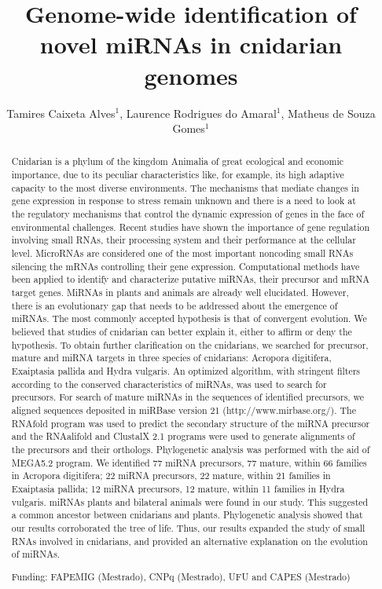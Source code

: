 \documentclass[twoside]{article}
\title{\vspace{-15mm}\fontsize{24pt}{10pt}\selectfont\textbf{Genome-wide identification of novel miRNAs in cnidarian genomes}} %
\author{Tamires Caixeta Alves$^1$, Laurence Rodrigues do Amaral$^1$, Matheus de Souza Gomes$^1$}
\affil{1 UFU\\ }
\date{}
\begin{document}
\maketitle %

\thispagestyle{fancy} %


\begin{abstract}
Cnidarian is a phylum of the kingdom Animalia of great ecological and economic importance, due to its peculiar characteristics like, for example, its high adaptive capacity to the most diverse environments. The mechanisms that mediate changes in gene expression in response to stress remain unknown and there is a need to look at the regulatory mechanisms that control the dynamic expression of genes in the face of environmental challenges. Recent studies have shown the importance of gene regulation involving small RNAs, their processing system and their performance at the cellular level. MicroRNAs are considered one of the most important noncoding small RNAs silencing the mRNAs controlling their gene expression. Computational methods have been applied to identify and characterize putative miRNAs, their precursor and mRNA target genes. MiRNAs in plants and animals are already well elucidated. However, there is an evolutionary gap that needs to be addressed about the emergence of miRNAs. The most commonly accepted hypothesis is that of convergent evolution. We believed that studies of cnidarian can better explain it, either to affirm or deny the hypothesis. To obtain further clarification on the cnidarians, we searched for precursor, mature and miRNA targets in three species of cnidarians: Acropora digitifera, Exaiptasia pallida and Hydra vulgaris. An optimized algorithm, with stringent filters according to the conserved characteristics of miRNAs, was used to search for precursors. For search of mature miRNAs in the sequences of identified precursors, we aligned sequences deposited in miRBase version 21 (http://www.mirbase.org/). The RNAfold program was used to predict the secondary structure of the miRNA precursor and the RNAalifold and ClustalX 2.1 programs were used to generate alignments of the precursors and their orthologs. Phylogenetic analysis was performed with the aid of MEGA5.2 program. We identified 77 miRNA precursors, 77 mature, within 66 families in Acropora digitifera; 22 miRNA precursors, 22 mature, within 21 families in Exaiptasia pallida; 12 miRNA precursors, 12 mature, within 11 families in Hydra vulgaris. miRNAs plants and bilateral animals were found in our study. This suggested a common ancestor between cnidarians and plants. Phylogenetic analysis showed that our results corroborated the tree of life. Thus, our results expanded the study of small RNAs involved in cnidarians, and provided an alternative explanation on the evolution of miRNAs.

Funding: FAPEMIG (Mestrado), CNPq (Mestrado), UFU and CAPES (Mestrado)
\end{abstract}
\end{document}
